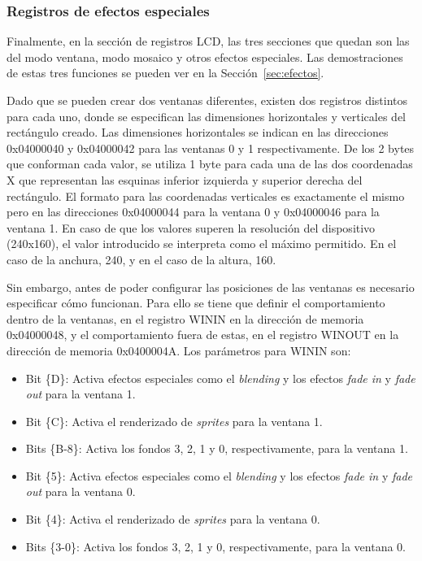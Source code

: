 \subsubsection{Registros de efectos especiales}

Finalmente, en la sección de registros LCD, las tres secciones que quedan son las del modo ventana, modo mosaico y otros efectos especiales. Las demostraciones de estas tres funciones se pueden ver en la Sección~\ref{sec:efectos}.

Dado que se pueden crear dos ventanas diferentes, existen dos registros distintos para cada uno, donde se especifican las dimensiones horizontales y verticales del rectángulo creado. Las dimensiones horizontales se indican en las direcciones 0x04000040 y 0x04000042 para las ventanas 0 y 1 respectivamente. De los 2 bytes que conforman cada valor, se utiliza 1 byte para cada una de las dos coordenadas X que representan las esquinas inferior izquierda y superior derecha del rectángulo. El formato para las coordenadas verticales es exactamente el mismo pero en las direcciones 0x04000044 para la ventana 0 y 0x04000046 para la ventana 1. En caso de que los valores superen la resolución del dispositivo (240x160), el valor introducido se interpreta como el máximo permitido. En el caso de la anchura, 240, y en el caso de la altura, 160. 

Sin embargo, antes de poder configurar las posiciones de las ventanas es necesario especificar cómo funcionan. Para ello se tiene que definir el comportamiento dentro de la ventanas, en el registro WININ en la dirección de memoria 0x04000048, y el comportamiento fuera de estas, en el registro WINOUT en la dirección de memoria 0x0400004A. Los parámetros para WININ son:

\begin{itemize}
	\item Bit \{D\}: Activa efectos especiales como el \textit{blending} y los efectos \textit{fade in} y \textit{fade out} para la ventana 1.
	\item Bit \{C\}: Activa el renderizado de \textit{sprites} para la ventana 1.
	\item Bits \{B-8\}: Activa los fondos 3, 2, 1 y 0, respectivamente, para la ventana 1.
	\item Bit \{5\}: Activa efectos especiales como el \textit{blending} y los efectos \textit{fade in} y \textit{fade out} para la ventana 0.
	\item Bit \{4\}: Activa el renderizado de \textit{sprites} para la ventana 0.
	\item Bits \{3-0\}: Activa los fondos 3, 2, 1 y 0, respectivamente, para la ventana 0.
\end{itemize}


